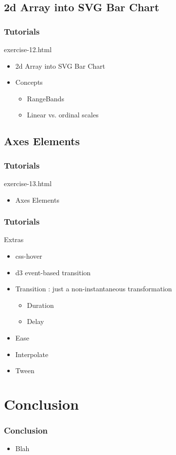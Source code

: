 \documentclass{beamer}
\begin{document}
\subsection{2d Array into SVG Bar Chart}

\begin{frame}
    \frametitle{Tutorials}
    \begin{block}{exercise-12.html}
        \pause
        \begin{itemize}
        \pause
        \item 2d Array into SVG Bar Chart
        \pause
        \item Concepts
            \begin{itemize}
                \item RangeBands
                \item Linear vs. ordinal scales
            \end{itemize}
        \end{itemize}
    \end{block}
\end{frame}


\subsection{Axes Elements}

\begin{frame}
    \frametitle{Tutorials}
    \begin{block}{exercise-13.html}
        \begin{itemize}
            \pause
            \item Axes Elements
        \end{itemize} 
    \end{block}
\end{frame}


\begin{frame}
    \frametitle{Tutorials}
    \begin{block}{Extras}
        \begin{itemize}
            \item css-hover
            \item d3 event-based transition
            \item Transition : just a non-instantaneous transformation
            \begin{itemize}
                \item Duration
                \item Delay
            \end{itemize}
            \item Ease
            \item Interpolate
            \item Tween
        \end{itemize}
    \end{block}
\end{frame}


\section{Conclusion}

\begin{frame}
    \frametitle{Conclusion}
    \begin{itemize}
        \item Blah
    \end{itemize}
\end{frame}
\end{document}
